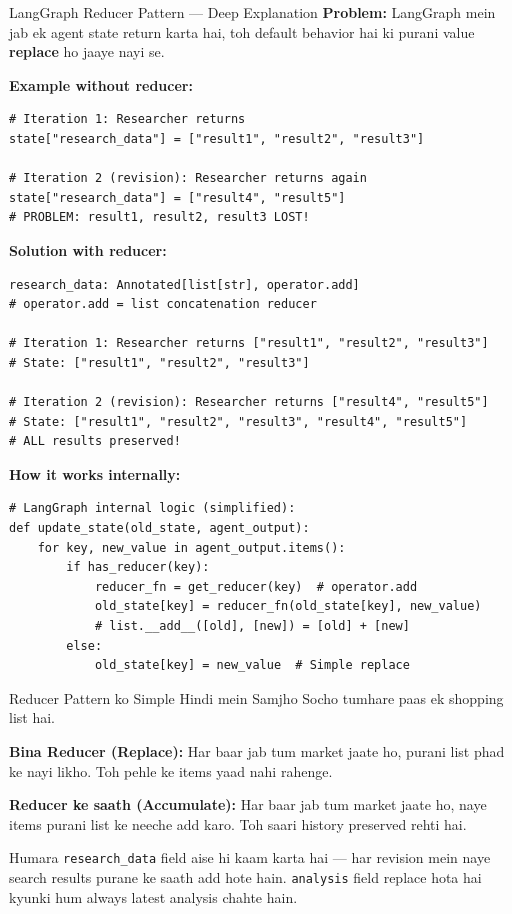 \documentclass[11pt,a4paper,twoside]{report}
\begin{document}
\begin{conceptbox}{LangGraph Reducer Pattern --- Deep Explanation}
\textbf{Problem:} LangGraph mein jab ek agent state return karta hai, toh default behavior hai ki purani value \textbf{replace} ho jaaye nayi se.

\textbf{Example without reducer:}
\begin{lstlisting}[style=pythonstyle]
# Iteration 1: Researcher returns
state["research_data"] = ["result1", "result2", "result3"]

# Iteration 2 (revision): Researcher returns again
state["research_data"] = ["result4", "result5"]
# PROBLEM: result1, result2, result3 LOST!
\end{lstlisting}

\textbf{Solution with reducer:}
\begin{lstlisting}[style=pythonstyle]
research_data: Annotated[list[str], operator.add]
# operator.add = list concatenation reducer

# Iteration 1: Researcher returns ["result1", "result2", "result3"]
# State: ["result1", "result2", "result3"]

# Iteration 2 (revision): Researcher returns ["result4", "result5"]
# State: ["result1", "result2", "result3", "result4", "result5"]
# ALL results preserved!
\end{lstlisting}

\textbf{How it works internally:}
\begin{lstlisting}[style=pythonstyle]
# LangGraph internal logic (simplified):
def update_state(old_state, agent_output):
    for key, new_value in agent_output.items():
        if has_reducer(key):
            reducer_fn = get_reducer(key)  # operator.add
            old_state[key] = reducer_fn(old_state[key], new_value)
            # list.__add__([old], [new]) = [old] + [new]
        else:
            old_state[key] = new_value  # Simple replace
\end{lstlisting}
\end{conceptbox}

\begin{hindibox}{Reducer Pattern ko Simple Hindi mein Samjho}
Socho tumhare paas ek shopping list hai.

\textbf{Bina Reducer (Replace):} Har baar jab tum market jaate ho, purani list phad ke nayi likho. Toh pehle ke items yaad nahi rahenge.

\textbf{Reducer ke saath (Accumulate):} Har baar jab tum market jaate ho, naye items purani list ke neeche add karo. Toh saari history preserved rehti hai.

Humara \texttt{research\_data} field aise hi kaam karta hai --- har revision mein naye search results purane ke saath add hote hain. \texttt{analysis} field replace hota hai kyunki hum always latest analysis chahte hain.
\end{hindibox}
\end{document}
